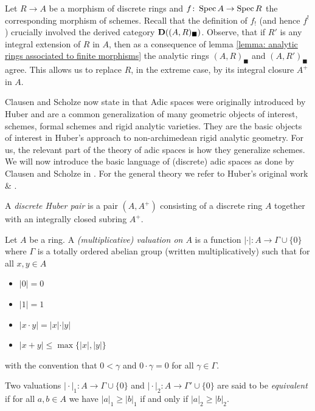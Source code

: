 
Let $R\to A$ be a morphism of discrete rings and $f\colon \operatorname{Spec} A\to \operatorname{Spec} R$ the corresponding morphism of schemes. Recall that the definition of $f_!$ (and hence $f^!$) crucially involved the derived category ${{\mathbf{D}}((A, R)_\blacksquare)}$. Observe, that if $R'$ is any integral extension of $R$ in $A$, then as a consequence of lemma \ref{lemma: analytic rings associated to finite morphisms} the analytic rings $(A, R)_\blacksquare$ and $(A, R')_\blacksquare$ agree. This allows us to replace $R$, in the extreme case, by its integral closure $A^+$ in $A$.

Clausen and Scholze now state in \cite[p. 62]{condenseddotpdf} that  Adic spaces were originally introduced by Huber and are a common generalization of many geometric objects of interest, \eg schemes, formal schemes and rigid analytic varieties. They are the basic objects of interest in Huber's approach to non-archimedean rigid analytic geometry. For us, the relevant part of the theory of adic spaces is how they generalize schemes. We will now introduce the basic language of (discrete) adic spaces as done by Clausen and Scholze in \cite[Lecture XI, X \& XI]{condenseddotpdf}. For the general theory we refer to Huber's original work \cite{huber93} \& \cite{huber94}.

\begin{definition}
	A \emph{discrete Huber pair} is a pair $(A, A^+)$ consisting of a discrete ring $A$ together with an integrally closed subring $A^+$.
\end{definition}

\begin{definition}[Valuations]
	Let $A$ be a ring. A \emph{(multiplicative) valuation on $A$} is a function $\vert\cdot\vert\colon A\to \Gamma \cup \{0\}$ where $\Gamma$ is a totally ordered abelian group (written multiplicatively) such that for all $x, y\in A$
	\begin{itemize}
		\item $\vert 0\vert = 0$
		\item $\vert 1\vert = 1$
		\item $\vert x\cdot y\vert = \vert x\vert\cdot \vert y\vert$
		\item $\vert x + y\vert \le \max \{\vert x\vert, \vert y\vert\}$
	\end{itemize}
	with the convention that $0 < \gamma$ and $0\cdot \gamma = 0$ for all $\gamma \in \Gamma$.
	
	Two valuations $\vert\cdot\vert_1\colon A\to \Gamma\cup\{0\}$ and $\vert\cdot\vert_2\colon A\to \Gamma'\cup \{0\}$ are said to be \emph{equivalent} if for all $a,b\in A$ we have $\vert a\vert_1\ge \vert b\vert_1$ if and only if $\vert a\vert_2\ge \vert b\vert_2$.
\end{definition}

